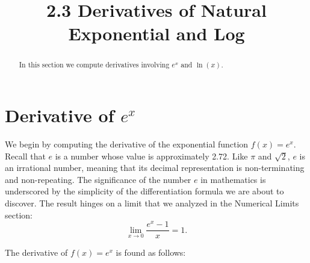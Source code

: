 \documentclass{ximera}
\title{2.3 Derivatives of Natural Exponential and Log}
\begin{document}
\begin{abstract}
In this section we compute derivatives involving $e^x$ and $\ln(x)$.
\end{abstract}

\maketitle


\begin{image}
\end{image}

\section{Derivative of $e^x$}

We begin by computing the derivative of the exponential function $f(x) = e^x$.  
Recall that $e$ is a number whose value is approximately 2.72.
Like $\pi$ and $\sqrt 2$, $e$ is an irrational number, meaning that its decimal representation 
is non-terminating and non-repeating. The significance of the number $e$ in mathematics
is underscored by the simplicity of the differentiation formula we are about to discover. 
The result hinges on a limit that we analyzed in the Numerical Limits section:
\[
\lim_{x \to 0} \frac{e^x - 1}{x} = 1.
\]

The derivative of $f(x) = e^x$ is found as follows:
\end{document}
